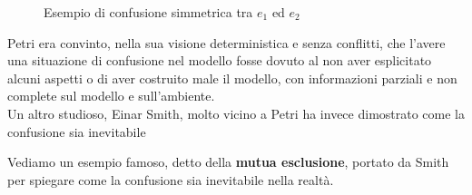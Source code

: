 \documentclass[a4paper,12pt, oneside]{book}
\begin{document}
\begin{definizione}
\begin{enumerate}
\begin{figure}[H]
      \caption{Esempio di confusione simmetrica tra $e_1$ ed $e_2$} 
    \end{figure}
  \end{enumerate}
  Petri era convinto, nella sua visione deterministica e senza conflitti, che
  l'avere una situazione di confusione nel modello fosse dovuto al non aver
  esplicitato alcuni aspetti o di aver costruito male il modello, con
  informazioni parziali e non complete sul modello e sull'ambiente.\\
  Un altro studioso, Einar Smith, molto vicino a Petri ha invece dimostrato come
  la confusione sia inevitabile
\end{definizione}
Vediamo un esempio famoso, detto della \textbf{mutua esclusione}, portato da
Smith per spiegare come la confusione sia inevitabile nella realtà.
\newpage
\end{document}
